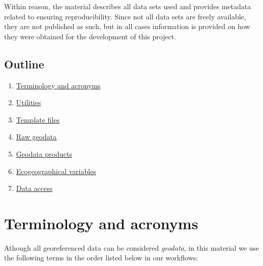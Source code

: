\documentclass[
]{book}
\begin{document}
Within reason, the material describes all data sets used and provides metadata
related to ensuring reproducibility. Since not all data sets are freely available,
they are not published as such, but in all cases information is provided on how
they were obtained for the development of this project.

\section*{Outline}\label{outline}

\begin{enumerate}
\def\labelenumi{\arabic{enumi}.}
\item
  \hyperref[Ch01]{Terminology and acronyms}
\item
  \hyperref[Ch02]{Utilities}
\item
  \hyperref[Ch03]{Template files}
\item
  \hyperref[Ch04]{Raw geodata}
\item
  \hyperref[Ch05]{Geodata products}
\item
  \hyperref[Ch06]{Ecogeographical variables}
\item
  \hyperref[Ch07]{Data access}
\end{enumerate}

\chapter{Terminology and acronyms}\label{Ch01}

Athough all georeferenced data can be considered \emph{geodata}, in this material we
use the following terms in the order listed below in our workflows:
\end{document}

